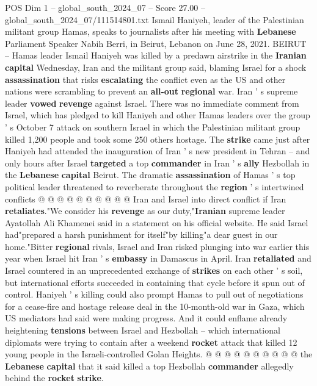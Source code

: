 \begin{textsample}{POS Dim 1 – global\_south\_2024\_07 – Score 27.00 – global\_south\_2024\_07/111514801.txt}  \label{ex:f1_pos_062}
Ismail Haniyeh, leader of the Palestinian militant group Hamas, speaks to journalists after his meeting with \textbf{Lebanese} Parliament Speaker Nabih Berri, in Beirut, Lebanon on June 28, 2021.
BEIRUT -- Hamas leader Ismail Haniyeh was killed by a predawn airstrike in the \textbf{Iranian} \textbf{capital} Wednesday, Iran and the militant group said, blaming Israel for a shock \textbf{assassination} that risks \textbf{escalating} the conflict even as the US and other nations were scrambling to prevent an \textbf{all-out} \textbf{regional} war.
Iran ' s supreme leader \textbf{vowed} \textbf{revenge} against Israel.
There was no immediate comment from Israel, which has pledged to kill Haniyeh and other Hamas leaders over the group ' s October 7 attack on southern Israel in which the Palestinian militant group killed 1,200 people and took some 250 others hostage.
The \textbf{strike} came just after Haniyeh had attended the inauguration of Iran ' s new president in Tehran -- and only hours after Israel \textbf{targeted} a top \textbf{commander} in Iran ' s \textbf{ally} Hezbollah in the \textbf{Lebanese} \textbf{capital} Beirut.
The dramatic \textbf{assassination} of Hamas ' s top political leader threatened to reverberate throughout the \textbf{region} ' s intertwined conflicts @ @ @ @ @ @ @ @ @ @ Iran and Israel into direct conflict if Iran \textbf{retaliates}."We consider his \textbf{revenge} as our duty,"\textbf{Iranian} supreme leader Ayatollah Ali Khamenei said in a statement on his official website.
He said Israel had"prepared a harsh punishment for itself"by killing"a dear guest in our home."Bitter \textbf{regional} rivals, Israel and Iran risked plunging into war earlier this year when Israel hit Iran ' s \textbf{embassy} in Damascus in April.
Iran \textbf{retaliated} and Israel countered in an unprecedented exchange of \textbf{strikes} on each other ' s soil, but international efforts succeeded in containing that cycle before it spun out of control.
Haniyeh ' s killing could also prompt Hamas to pull out of negotiations for a cease-fire and hostage release deal in the 10-month-old war in Gaza, which US mediators had said were making progress.
And it could enflame already heightening \textbf{tensions} between Israel and Hezbollah -- which international diplomats were trying to contain after a weekend \textbf{rocket} attack that killed 12 young people in the Israeli-controlled Golan Heights. @ @ @ @ @ @ @ @ @ @ the \textbf{Lebanese} \textbf{capital} that it said killed a top Hezbollah \textbf{commander} allegedly behind the \textbf{rocket} \textbf{strike}.

\end{textsample}
